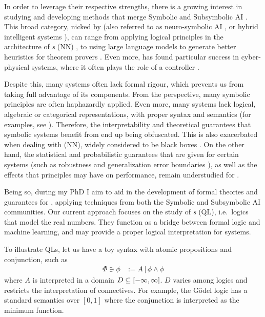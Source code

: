 In order to leverage their respective strengths, there is a growing interest in studying and developing methods that merge Symbolic and Subsymbolic AI \mcita{}. This broad category, nicked \emph{\InAI{}} by \citeauthor{Platzer_2024} (also referred to as neuro-symbolic AI \mcita{}, or hybrid intelligent systems \mcita{}), can range from applying logical principles in the architecture of \emph{ \NN{}s} (NN)  \mcita{}, to using large language models to generate better heuristics for theorem provers \mcita{}. Even more, \InAI{} has found particular success in cyber-physical systems, where it often plays the role of a controller \citep{Platzer_2024}. 

Despite this, many \InAI{} systems often lack formal rigour, which prevents us from taking full advantage of its components. From the \SiAI{} perspective,  many symbolic principles are often haphazardly applied. Even more, many \InAI{} systems lack logical, algebraic or categorical representations, with proper syntax and semantics (for examples, see \mcita{}). Therefore, the interpretability and theoretical guarantees that symbolic systems benefit from end up being obfuscated. This is also exacerbated when dealing with \emph{\NN{}} (NN), widely considered to be black boxes \mcita{}. On the other hand, the statistical and probabilistic guarantees that are given for certain \SuAI{}  systems (such as robustness \mcita{} and generalization error boundaries \mcita{} ), as well as the effects that \SiAI{} principles may have on performance, remain understudied for \InAI{}.

Being so, during my PhD I aim to aid in the development of formal theories and guarantees for \InAI{}, applying techniques from both the Symbolic and Subsymbolic AI communities. Our current approach focuses on the study of \emph{\QL{}s} (QL), i.e.~logics that model the real numbers. They function as a bridge between formal logic and machine learning, and may provide a proper logical interpretation for \InAI{} systems.

To illustrate QLs, let us have a toy syntax with atomic propositions and conjunction, such as
\begin{equation}
\begin{split}
    \Phi \ni \phi &:= A \,|\, \phi \land \phi
\end{split}
\end{equation}
where $A$ is interpreted in a domain $D \subseteq [-\infty,\infty]$. $D$ varies among logics and restricts the interpretation of connectives. For example, the
G\"{o}del logic \mcita{} has a standard semantics over $[0, 1]$ where the conjunction is interpreted as the minimum function.

